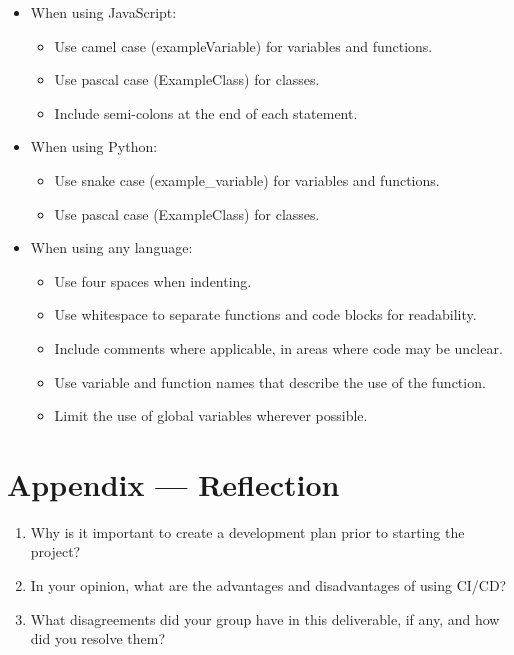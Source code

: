 \documentclass{article}
\begin{document}
\begin{itemize}
  \item When using JavaScript:
  \begin{itemize}
    \item Use camel case (exampleVariable) for variables and functions.
    \item Use pascal case (ExampleClass) for classes.
    \item Include semi-colons at the end of each statement.
  \end{itemize}
  \item When using Python:
  \begin{itemize}
    \item Use snake case (example\_variable) for variables and functions.
    \item Use pascal case (ExampleClass) for classes.
  \end{itemize}
  \item When using any language:
  \begin{itemize}
    \item Use four spaces when indenting.
    \item Use whitespace to separate functions and code blocks for readability.
    \item Include comments where applicable, in areas where code may be unclear.
    \item Use variable and function names that describe the use of the function.
    \item Limit the use of global variables wherever possible.
  \end{itemize}
\end{itemize}


\newpage{}

\section*{Appendix --- Reflection}




\begin{enumerate}
    \item Why is it important to create a development plan prior to starting the
    project?
    \item In your opinion, what are the advantages and disadvantages of using
    CI/CD?
    \item What disagreements did your group have in this deliverable, if any,
    and how did you resolve them?
\end{enumerate}
\end{document}

